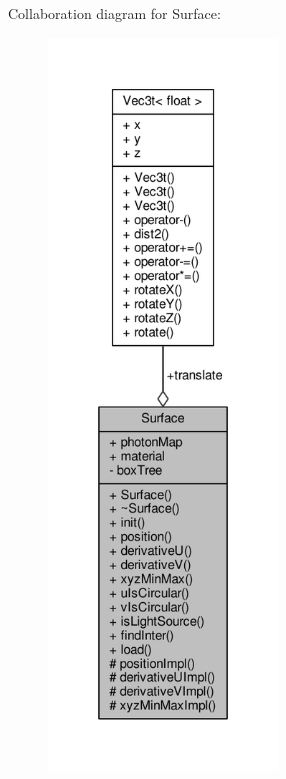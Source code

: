 Collaboration diagram for Surface\+:\nopagebreak
\begin{figure}[H]
\begin{center}
\leavevmode
\includegraphics[height=550pt]{classSurface__coll__graph}
\end{center}
\end{figure}
